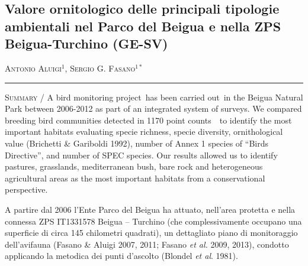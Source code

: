 \setcounter{figure}{0}
\setcounter{table}{0}

\begin{adjustwidth}{-3.5cm}{0cm}
\pagestyle{CIOpage}
\chapter*[Valore ornitologico del Parco del Beigua e della ZPS Beigua-Turchino]{Valore ornitologico delle principali tipologie ambientali nel Parco del Beigua e nella ZPS Beigua-Turchino (GE-SV)}

\textsc{Antonio Aluigi}$^{1}$, \textsc{Sergio G. Fasano}$^{1*}$ \\

 
\noindent\color{MUSEBLUE}\rule{27cm}{2pt}
\vspace{1cm}
\end{adjustwidth}


{\small
\noindent \textsc{\color{MUSEBLUE} Summary } / A bird monitoring project~has been carried out~in the Beigua Natural 
Park between 2006-2012 as part of an integrated system of surveys. We
compared breeding bird communities detected in 1170 point counts~~to
identify the most important habitats evaluating specie richness, specie
diversity, ornithological value (Brichetti \& Gariboldi 1992), number
of Annex 1 species of  {\textquotedblleft}Birds
Directive{\textquotedblright}, and number of SPEC species. Our results
allowed us to identify pastures, grasslands, mediterranean bush, bare
rock and heterogeneous agricultural areas as the most important
habitats from a conservational perspective.
}
\vspace{1cm}

A partire dal 2006 l{\textquoteright}Ente Parco del Beigua ha attuato,
nell{\textquoteright}area protetta e nella connessa ZPS IT1331578
Beigua -- Turchino (che complessivamente occupano una superficie di
circa 145 chilometri quadrati), un dettagliato piano di monitoraggio
dell{\textquoteright}avifauna (Fasano \& Aluigi 2007, 2011; Fasano
\textit{et al. }2009, 2013), condotto applicando la metodica dei punti
d{\textquoteright}ascolto (Blondel \textit{et al}. 1981). 

